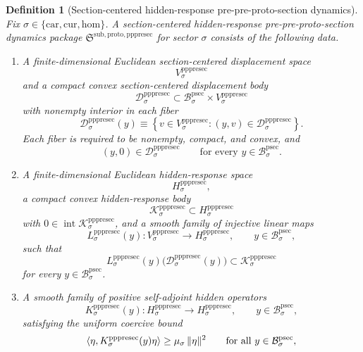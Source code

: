 \documentclass[11pt]{article}
\newcommand{\Car}{\mathrm{car}}
\newcommand{\Cur}{\mathrm{cur}}
\newcommand{\Hom}{\mathrm{hom}}
\newcommand{\ProtoSectionBody}[1]{\mathcal B_{#1}^{\mathrm{psec}}}
\newcommand{\PrePreProtoSectionPackage}{\mathfrak S^{\mathrm{sub,proto,pppresec}}}
\newcommand{\PrePreProtoSectionVertical}[1]{V_{#1}^{\mathrm{pppresec}}}
\newcommand{\PrePreProtoSectionResidualBody}[1]{\mathcal D_{#1}^{\mathrm{pppresec}}}
\newcommand{\PrePreProtoSectionHidden}[1]{H_{#1}^{\mathrm{pppresec}}}
\newcommand{\PrePreProtoSectionHiddenBody}[1]{\mathcal K_{#1}^{\mathrm{pppresec}}}
\newcommand{\PrePreProtoSectionResponseMap}[1]{L_{#1}^{\mathrm{pppresec}}}
\newcommand{\PrePreProtoSectionOperator}[1]{K_{#1}^{\mathrm{pppresec}}}
\newtheorem{definition}{Definition}
\begin{document}
\begin{definition}[Section-centered hidden-response pre-pre-proto-section dynamics]
\label{def:deeppackage}
Fix \(\sigma\in\{\Car,\Cur,\Hom\}\). A \emph{section-centered hidden-response pre-pre-proto-section dynamics package} \(\PrePreProtoSectionPackage\) for sector \(\sigma\) consists of the following data.
\begin{enumerate}
    \item A finite-dimensional Euclidean section-centered displacement space
    \[
    \PrePreProtoSectionVertical{\sigma}
    \]
    and a compact convex section-centered displacement body
    \[
    \PrePreProtoSectionResidualBody{\sigma}
    \subset
    \ProtoSectionBody{\sigma}\times\PrePreProtoSectionVertical{\sigma}
    \]
    with nonempty interior in each fiber
    \[
    \PrePreProtoSectionResidualBody{\sigma}(y)
    \equiv
    \left\{
    v\in\PrePreProtoSectionVertical{\sigma}:(y,v)\in\PrePreProtoSectionResidualBody{\sigma}
    \right\}.
    \]
    Each fiber is required to be nonempty, compact, and convex, and
    \[
    (y,0)\in\PrePreProtoSectionResidualBody{\sigma}
    \qquad
    \text{for every }
    y\in\ProtoSectionBody{\sigma}.
    \]
    \item A finite-dimensional Euclidean hidden-response space
    \[
    \PrePreProtoSectionHidden{\sigma},
    \]
    a compact convex hidden-response body
    \[
    \PrePreProtoSectionHiddenBody{\sigma}
    \subset
    \PrePreProtoSectionHidden{\sigma}
    \]
    with \(0\in\operatorname{int}\PrePreProtoSectionHiddenBody{\sigma}\), and a smooth family of injective linear maps
    \[
    \PrePreProtoSectionResponseMap{\sigma}(y):
    \PrePreProtoSectionVertical{\sigma}\to\PrePreProtoSectionHidden{\sigma},
    \qquad
    y\in\ProtoSectionBody{\sigma},
    \]
    such that
    \[
    \PrePreProtoSectionResponseMap{\sigma}(y)\bigl(\PrePreProtoSectionResidualBody{\sigma}(y)\bigr)
    \subset
    \PrePreProtoSectionHiddenBody{\sigma}
    \]
    for every \(y\in\ProtoSectionBody{\sigma}\).
    \item A smooth family of positive self-adjoint hidden operators
    \[
    \PrePreProtoSectionOperator{\sigma}(y):
    \PrePreProtoSectionHidden{\sigma}\to\PrePreProtoSectionHidden{\sigma},
    \qquad
    y\in\ProtoSectionBody{\sigma},
    \]
    satisfying the uniform coercive bound
    \begin{equation}
    \ev{\eta,\PrePreProtoSectionOperator{\sigma}(y)\eta}
    \ge
    \mu_{\sigma}\,\|\eta\|^{2}
    \qquad
    \text{for all }
    y\in\ProtoSectionBody{\sigma},

\end{equation}
\end{enumerate}
\end{definition}
\end{document}
